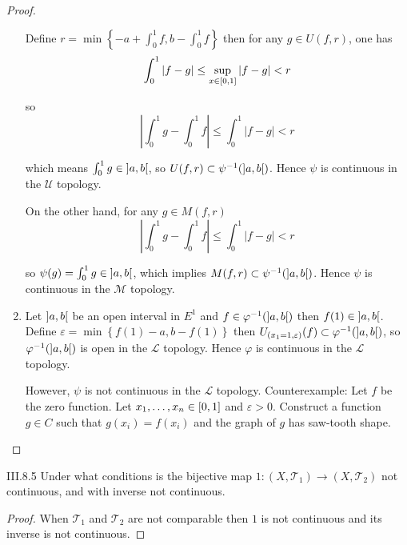 \begin{proof}
\begin{enumerate}[label={(\alph*)}]
		      Define \( r = \min\left\{ -a + \int_{0}^{1}f, b - \int_{0}^{1}f  \right\} \) then for any \( g \in U(f, r) \), one has
		      \[
			      \int_{0}^{1}\left\vert f - g \right\vert \le \sup\limits_{x\in\left\lbrack{0,1}\right\rbrack} \left\vert f - g \right\vert < r
		      \]

		      so
		      \[
			      \left\vert \int_{0}^{1} g - \int_{0}^{1} f \right\vert \le \int_{0}^{1} \left\vert f - g \right\vert < r
		      \]

		      which means \( \int_{0}^{1} g \in \left\rbrack{a,b}\right\lbrack \), so \( U(f, r) \subset \psi^{-1}(\left\rbrack{a, b}\right\lbrack) \). Hence \( \psi \) is continuous in the \( \mathscr{U} \) topology.

		      On the other hand, for any \( g \in M(f, r) \)
		      \[
			      \left\vert \int_{0}^{1} g - \int_{0}^{1} f \right\vert \le \int_{0}^{1} \left\vert f - g \right\vert < r
		      \]

		      so \( \psi(g) = \int_{0}^{1} g \in \left\rbrack{a, b}\right\lbrack \), which implies \( M(f, r) \subset \psi^{-1}(\left\rbrack{a, b}\right\lbrack) \). Hence \( \psi \) is continuous in the \( \mathscr{M} \) topology.
		\item Let \( \left\rbrack{a, b}\right\lbrack \) be an open interval in \( E^{1} \) and \( f \in \varphi^{-1}(\left\rbrack{a, b}\right\lbrack) \) then \( f(1) \in \left\rbrack{a, b}\right\lbrack \). Define \( \varepsilon = \min\left\{ f(1) - a, b - f(1) \right\} \) then \( U_{(x_{1} = 1, \varepsilon)}(f) \subset \varphi^{-1}(\left\rbrack{a, b}\right\lbrack) \), so \( \varphi^{-1}(\left\rbrack{a, b}\right\lbrack) \) is open in the \( \mathscr{L} \) topology. Hence \( \varphi \) is continuous in the \( \mathscr{L} \) topology.

		      However, \( \psi \) is not continuous in the \( \mathscr{L} \) topology. Counterexample: Let \( f \) be the zero function. Let \( x_{1}, \ldots, x_{n} \in \left\lbrack{0,1}\right\rbrack \) and \( \varepsilon > 0 \). Construct a function \( g \in C \) such that \( g(x_{i}) = f(x_{i}) \) and the graph of \( g \) has saw-tooth shape.
	\end{enumerate}
\end{proof}

\begin{problem}{III.8.5}
Under what conditions is the bijective map \( 1: (X, \mathscr{T}_{1}) \to (X, \mathscr{T}_{2}) \) not continuous, and with inverse not continuous.
\end{problem}

\begin{proof}
	When \( \mathscr{T}_{1} \) and \( \mathscr{T}_{2} \) are not comparable then \( 1 \) is not continuous and its inverse is not continuous.
\end{proof}

